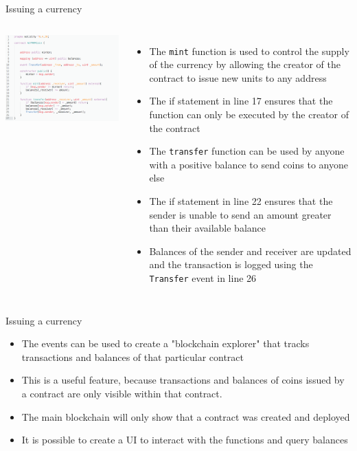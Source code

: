 \documentclass[11pt]{beamer}
\begin{document}
\begin{frame}{Issuing a currency}
	\begin{columns}
	    \includegraphics  [scale=0.3]{Images/contract_new}

	    \begin{itemize}
			\item The \texttt{mint} function is used to control the supply of the currency by allowing the creator of the contract to issue new units to any address
			\item The if statement in line 17 ensures that the function can only be executed by the creator of the contract
			\item The \texttt{transfer} function can be used by anyone with a positive balance to send coins to anyone else
			\item The if statement in line 22 ensures that the sender is unable to send an amount greater than their available balance
			\item Balances of the sender and receiver are updated and the transaction is logged using the \texttt{Transfer} event in line 26
	    \end{itemize}
	\end{columns}
\end{frame}


\begin{frame}{Issuing a currency}
	\begin{itemize}
		\item The events can be used to create a "blockchain explorer" that tracks transactions and balances of that particular contract
		\item This is a useful feature, because transactions and balances of coins issued by a contract are only visible within that contract.
		\item The main blockchain will only show that a contract was created and deployed
		\item It is possible to create a UI to interact with the functions and query balances
	\end{itemize}
\end{frame}
\end{document}
